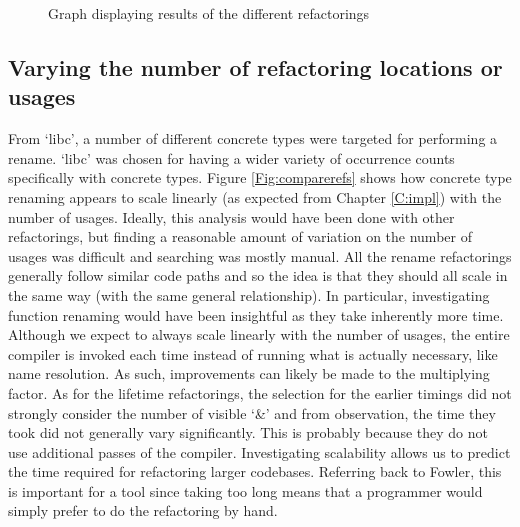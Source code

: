 \begin{figure}[H]
\begin{center}
\caption{Graph displaying results of the different refactorings}
\label{Fig:compareref}
\end{center}
\end{figure}

\subsection{Varying the number of refactoring locations or usages}
From `libc', a number of different concrete types were targeted for performing a rename. `libc' was chosen for having a wider variety of occurrence counts specifically with concrete types. Figure \ref{Fig:comparerefs} shows how concrete type renaming appears to scale linearly (as expected from Chapter \ref{C:impl}) with the number of usages. Ideally, this analysis would have been done with other refactorings, but finding a reasonable amount of variation on the number of usages was difficult and searching was mostly manual. All the rename refactorings generally follow similar code paths and so the idea is that they should all scale in the same way (with the same general relationship). In particular, investigating function renaming would have been insightful as they take inherently more time. Although we expect to always scale linearly with the number of usages, the entire compiler is invoked each time instead of running what is actually necessary, like name resolution. As such, improvements can likely be made to the multiplying factor. As for the lifetime refactorings, the selection for the earlier timings did not strongly consider the number of visible `\&' and from observation, the time they took did not generally vary significantly. This is probably because they do not use additional passes of the compiler. Investigating scalability allows us to predict the time required for refactoring larger codebases. Referring back to Fowler, this is important for a tool since taking too long means that a programmer would simply prefer to do the refactoring by hand.

